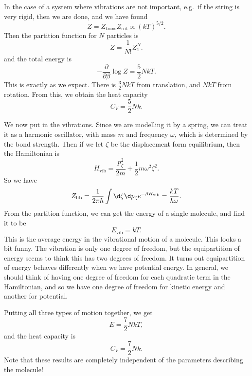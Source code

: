 \documentclass[a4paper]{article}
\begin{document}
\begin{eg}
  In the case of a system where vibrations are not important, e.g.\ if the string is very rigid, then we are done, and we have found
  \[
    Z = Z_{\mathrm{trans}} Z_{\mathrm{rot}} \propto (kT)^{5/2}.
  \]
  Then the partition function for $N$ particles is
  \[
    Z = \frac{1}{N!} Z_1^N.
  \]
  and the total energy is
  \[
    -\frac{\partial}{\partial \beta} \log Z = \frac{5}{2} NkT.
  \]
  This is exactly as we expect. There is $\frac{3}{2}NkT$ from translation, and $NkT$ from rotation. From this, we obtain the heat capacity
  \[
    C_V = \frac{5}{2} Nk.
  \]
\end{eg}
We now put in the vibrations. Since we are modelling it by a spring, we can treat it as a harmonic oscillator, with mass $m$ and frequency $\omega$, which is determined by the bond strength. Then if we let $\zeta$ be the displacement form equilibrium, then the Hamiltonian is
\[
  H_{\mathrm{vib}} = \frac{p_\zeta^2}{2m} + \frac{1}{2}m \omega^2 \zeta^2.
\]
So we have
\[
  Z_{\mathrm{fib}} = \frac{1}{2\pi \hbar} \int \d \zeta \d p_\zeta e^{-\beta H_{\mathrm{vib}}} = \frac{kT}{\hbar \omega}.
\]
From the partition function, we can get the energy of a single molecule, and find it to be
\[
  E_{\mathrm{vib}} = kT.
\]
This is the average energy in the vibrational motion of a molecule. This looks a bit funny. The vibration is only one degree of freedom, but the equipartition of energy seems to think this has two degrees of freedom. It turns out equipartition of energy behaves differently when we have potential energy. In general, we should think of having one degree of freedom for each quadratic term in the Hamiltonian, and so we have one degree of freedom for kinetic energy and another for potential.

Putting all three types of motion together, we get
\[
  E = \frac{7}{2} NkT,
\]
and the heat capacity is
\[
  C_V = \frac{7}{2}Nk.
\]
Note that these results are completely independent of the parameters describing the molecule!
\end{document}
